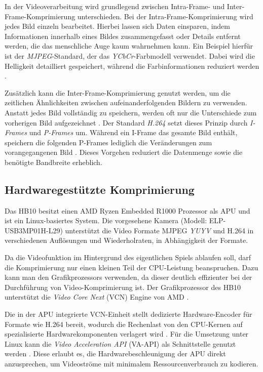 In der Videoverarbeitung wird grundlegend zwischen Intra-Frame- und Inter-Frame-Komprimierung unterschieden. Bei der Intra-Frame-Komprimierung wird jedes Bild einzeln bearbeitet. Hierbei lassen sich Daten einsparen, 
indem Informationen innerhalb eines Bildes zusammengefasst oder Details entfernt werden, die das menschliche Auge kaum wahrnehmen kann. Ein Beispiel hierfür ist der \textit{MJPEG}-Standard, 
der das \textit{YCbCr}-Farbmodell verwendet. Dabei wird die Helligkeit detailliert gespeichert, während die Farbinformationen reduziert werden \parencite{pearson_an}. \newline

Zusätzlich kann die Inter-Frame-Komprimierung genutzt werden, um die zeitlichen Ähnlichkeiten zwischen aufeinanderfolgenden Bildern zu verwenden. Anstatt jedes Bild vollständig zu speichern,
werden oft nur die Unterschiede zum vorherigen Bild aufgezeichnet \parencite{putra_2023_interframe}. Der Standard \textit{H.264} setzt dieses Prinzip durch \textit{I-Frames} und \textit{P-Frames} um. 
Während ein I-Frame das gesamte Bild enthält, speichern die folgenden P-Frames lediglich die Veränderungen zum vorangegangenen Bild \parencite{kalva_the}. Dieses
Vorgehen reduziert die Datenmenge sowie die benötigte Bandbreite erheblich.

\subsection{Hardwaregestützte Komprimierung} \label{sec:hwComp}

Das HB10 besitzt einen AMD Ryzen Embedded R1000 Prozessor als APU und ist ein Linux-basiertes System. Die vorgesehene Kamera (Modell: ELP-USB3MP01H-L29) unterstützt die Video Formate MJPEG \textit{YUYV} und H.264 in verschiedenen Auflösungen und Wiederholraten,
in Abhängigkeit der Formate.\newline

Da die Videofunktion im Hintergrund des eigentlichen Spiels ablaufen soll, darf die Komprimierung nur einen kleinen Teil der CPU-Leistung beanspruchen. Dazu kann man den Grafikprozessors verwenden, da dieser deutlich effizienter bei der Durchführung von Video-Komprimierung ist. 
Der Grafikprozessor des HB10 unterstützt die \textit{Video Core Next} (VCN) Engine von AMD  \parencite{_2025_amd,_r1000}.\newline

Die in der APU integrierte VCN-Einheit stellt dedizierte Hardware-Encoder für Formate wie H.264 bereit, wodurch die Rechenlast von den CPU-Kernen auf spezialisierte Hardwarekomponenten verlagert 
wird \parencite{_r1000, _2025_amd}. Für die Umsetzung unter Linux kann die \textit{Video Acceleration API} (VA-API) als Schnittstelle genutzt werden \parencite{_2026_ffmpeg}. Diese erlaubt es, 
die Hardwarebeschleunigung der APU direkt anzusprechen, um Videoströme mit minimalem Ressourcenverbrauch zu kodieren.

